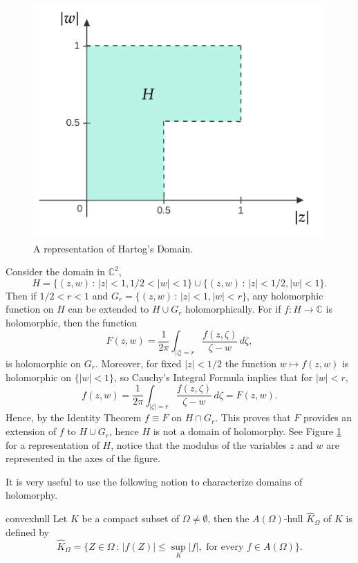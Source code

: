 \begin{figure}[h!]
  \centering
  \includegraphics[scale=.2]{d002}
  \caption{A representation of Hartog's Domain.}
  \label{fig:H}
\end{figure}

\begin{myexmp}[breakable]{}{}
Consider the domain in $\mathbb{C}^2$,
$$H = \{(z,w)\,:\,|z|<1, 1/2<|w|<1\} \cup \{(z,w)\,:\,|z|<1/2, |w|<1\}.$$
Then if $1/2<r<1$ and $G_r = \{(z,w)\,:\,|z|<1, |w|<r\}$, any holomorphic function on $H$ can be extended to $H\cup G_r$ holomorphically. For if $f:H\rightarrow \mathbb{C}$ is holomorphic, then the function
$$F(z,w) = \frac{1}{2\pi} \int_{|\zeta|=r} \frac{f(z,\zeta)}{\zeta-w}\,d\zeta,$$
is holomorphic on $G_r$. Moreover, for fixed $|z|<1/2$ the function $w\mapsto f(z,w)$ is holomorphic on $\{|w|<1\}$, so Cauchy's Integral Formula implies that for $|w|<r$,
$$f(z,w) = \frac{1}{2\pi} \int_{|\zeta|=r} \frac{f(z,\zeta)}{\zeta-w}\,d\zeta = F(z,w).$$
Hence, by the Identity Theorem $f\equiv F$ on $H\cap G_r$. This proves that $F$ provides an extension of $f$ to $H\cup G_r$, hence $H$ is not a domain of holomorphy. See Figure \ref{fig:H} for a representation of $H$, notice that the modulus of the variables $z$ and $w$ are represented in the axes of the figure.
\end{myexmp}

It is very useful to use the following notion to characterize domains of holomorphy.

\begin{mydef}{}{convexhull}
Let $K$ be a compact subset of $\Omega\neq \emptyset$, then the $A(\Omega)$-hull $\widehat{K}_\Omega$ of $K$ is defined by
$$\widehat{K}_\Omega = \{Z\in \Omega\,:\, |f(Z)| \leq \sup_K |f|, \text{ for every } f\in A(\Omega)\}.$$
\end{mydef}

